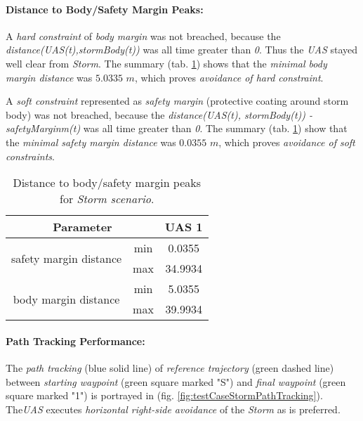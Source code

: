     
    \paragraph{Distance to Body/Safety Margin Peaks:} A \emph{hard constraint} of \emph{body margin} was not breached, because the \emph{distance(UAS(t),stormBody(t))} was all time greater than \emph{0}. Thus the \emph{UAS} stayed well clear from \emph{Storm}. The summary (tab. \ref{tab:testCaseStormSafetyAndBodyMarginDistances}) shows that the \emph{minimal body margin distance} was $5.0335$ $m$, which proves \emph{avoidance of hard constraint}.
    
    A \emph{soft constraint} represented as \emph{safety margin} (protective coating around storm body) was not breached, because the \emph{distance(UAS(t), stormBody(t)) - safetyMarginm(t)} was all time greater than \emph{0}.  The summary (tab. \ref{tab:testCaseStormSafetyAndBodyMarginDistances}) show that the \emph{minimal safety margin distance} was $0.0355$ $m$, which proves \emph{avoidance of soft constraints}.
    
    \begin{table}[H]
        \centering
        \begin{tabular}{c|c||c}
        \multicolumn{2}{c||}{Parameter} & UAS 1 \\\hline\hline
        \multirow{2}{*}{safety margin distance} & min & 0.0355 \\\cline{2-3}
                                                & max & 34.9934 \\\hline
        \multirow{2}{*}{body margin distance}   & min & 5.0355 \\\cline{2-3}
                                                & max & 39.9934 
        \end{tabular}
        \caption{Distance to body/safety margin peaks for \emph{Storm scenario}.}
        \label{tab:testCaseStormSafetyAndBodyMarginDistances}
    \end{table}
    
    \paragraph{Path Tracking Performance:} The \emph{path tracking} (blue solid line) of \emph{reference trajectory} (green dashed line) between \emph{starting waypoint} (green square marked "S") and \emph{final waypoint} (green square marked "1") is portrayed in (fig. \ref{fig:testCaseStormPathTracking}). The\emph{UAS} executes \emph{horizontal right-side avoidance} of the \emph{Storm} as is preferred. 
    
